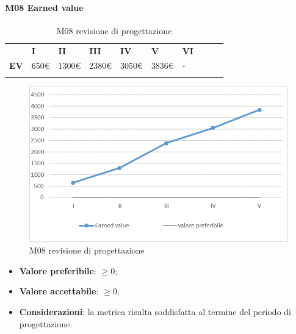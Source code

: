 \paragraph{M08 Earned value} \mbox{}
\begin{longtable}[H!] {						
		>{}p{38mm}  		
		>{}p{12mm}
		>{}p{12mm}		
		>{}p{12mm}		
		>{}p{12mm}		
		>{}p{12mm}		
		>{}p{12mm}
		>{}p{12mm}
		>{}p{12mm}
		>{}p{12mm}
	}
	\rowcolor{gray!50}
	\textbf{} & \textbf{I} & \textbf{II} & \textbf{III} & \textbf{IV} & \textbf{V} & \textbf{VI} \TBstrut \\ [2mm]
	\textbf{EV} & 650\euro & 1300\euro & 2380\euro & 3050\euro & 3836\euro & - \TBstrut \\ [2mm]
	\rowcolor{white}
	\caption{M08 revisione di progettazione}
\end{longtable}
\begin{figure}[H] 	
\includegraphics[width=\linewidth]{./img/grafici/RP5.png}	
\caption{M08 revisione di progettazione}	
\end{figure}
\begin{itemize}
	\item \textbf{Valore preferibile}: $\ge0$;
	\item \textbf{Valore accettabile}: $\ge0$;
	\item \textbf{Considerazioni}: la metrica risulta soddisfatta al termine del periodo di progettazione.
\end{itemize}
